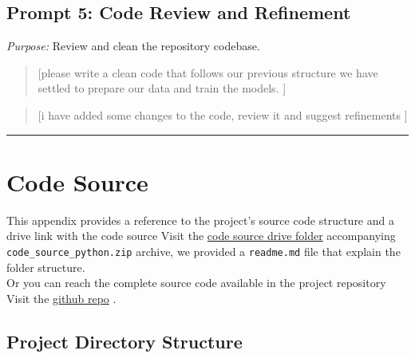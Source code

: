 \documentclass[12pt,a4paper]{report}
\begin{document}
\section{Prompt 5: Code Review and Refinement}

\textit{Purpose:} Review and clean the repository codebase.

\begin{quote}
\small
[please write a clean code that follows our previous structure we have settled to prepare our data and train the models. ]
\end{quote}

\begin{quote}
\small
[i have added some changes to the code, review it and suggest refinements ]
\end{quote}

\noindent\rule{\linewidth}{0.4pt}


\chapter{Code Source}

This appendix provides a reference to the project's source code structure and a drive link with the code source Visit the \href{https://drive.google.com/drive/folders/1acFij4zzy2zLN1oG3iJ6ZrTTZYlHmEwi?usp=sharing}{code source drive folder} accompanying \texttt{code\_source\_python.zip} archive, we provided a \texttt{readme.md} file that explain the folder structure.\\
Or you can reach the complete source code available in the project repository Visit the \href{https://github.com/adillekhbioui-collab/Portscan_IDS}{github repo} .

\section{Project Directory Structure}
\end{document}
